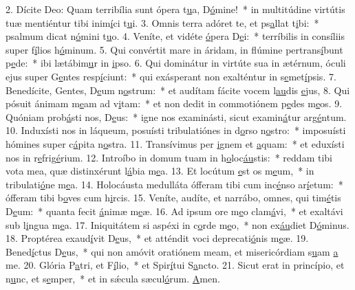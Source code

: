 2. Dícite Deo: Quam terribília sunt ópera t\uline{u}a, D\uline{ó}mine!~* in multitúdine virtútis tuæ mentiéntur tibi inim\uline{í}ci t\uline{u}i.
3. Omnis terra adóret te, et ps\uline{a}llat t\uline{i}bi:~* psalmum dicat n\uline{ó}mini t\uline{u}o.
4. Veníte, et vidéte \uline{ó}pera D\uline{e}i:~* terríbilis in consíliis super f\uline{í}lios h\uline{ó}minum.
5. Qui convértit mare in áridam, in flúmine pertrans\uline{í}bunt p\uline{e}de:~* ibi lætábim\uline{u}r in \uline{i}pso.
6. Qui dominátur in virtúte sua in ætérnum, óculi ejus super G\uline{e}ntes resp\uline{í}ciunt:~* qui exásperant non exalténtur in s\uline{e}met\uline{í}psis.
7. Benedícite, Gentes, D\uline{e}um n\uline{o}strum:~* et audítam fácite vocem l\uline{au}dis \uline{e}jus,
8. Qui pósuit ánimam m\uline{e}am ad v\uline{i}tam:~* et non dedit in commotiónem p\uline{e}des m\uline{e}os.
9. Quóniam prob\uline{á}sti nos, D\uline{e}us:~* igne nos examinásti, sicut examin\uline{á}tur arg\uline{é}ntum.
10. Induxísti nos in láqueum, posuísti tribulatiónes in d\uline{o}rso n\uline{o}stro:~* imposuísti hómines super c\uline{á}pita n\uline{o}stra.
11. Transívimus per \uline{i}gnem et \uline{a}quam:~* et eduxísti nos in r\uline{e}frig\uline{é}rium.
12. Introíbo in domum tuam in h\uline{o}loc\uline{áu}stis:~* reddam tibi vota mea, quæ distinxérunt l\uline{á}bia m\uline{e}a.
13. Et locútum \uline{e}st os m\uline{e}um,~* in tribulati\uline{ó}ne m\uline{e}a.
14. Holocáusta medulláta ófferam tibi cum inc\uline{é}nso ar\uline{í}etum:~* ófferam tibi b\uline{o}ves cum h\uline{i}rcis.
15. Veníte, audíte, et narrábo, omnes, qui tim\uline{é}tis D\uline{e}um:~* quanta fecit \uline{á}nimæ m\uline{e}æ.
16. Ad ipsum ore m\uline{e}o clam\uline{á}vi,~* et exaltávi sub l\uline{i}ngua m\uline{e}a.
17. Iniquitátem si aspéxi in c\uline{o}rde m\uline{e}o,~* non ex\uline{áu}diet D\uline{ó}minus.
18. Proptérea exaud\uline{í}vit D\uline{e}us,~* et atténdit voci deprecati\uline{ó}nis m\uline{e}æ.
19. Bened\uline{í}ctus D\uline{e}us,~* qui non amóvit oratiónem meam, et misericórdiam s\uline{u}am \uline{a} me.
20. Glória P\uline{a}tri, et F\uline{í}lio,~* et Spir\uline{í}tui S\uline{a}ncto.
21. Sicut erat in princípio, et n\uline{u}nc, et s\uline{e}mper,~* et in sǽcula sæcul\uline{ó}rum. \uline{A}men.
